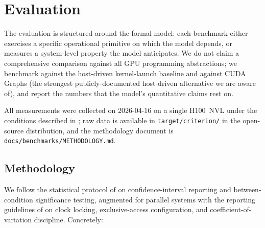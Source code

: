 \section{Evaluation}
\label{sec:evaluation}

The evaluation is structured around the formal model: each
benchmark either exercises a specific operational primitive on
which the model depends, or measures a system-level property the
model anticipates.  We do not claim a comprehensive comparison
against all GPU programming abstractions; we benchmark against the
host-driven kernel-launch baseline and against CUDA Graphs (the
strongest publicly-documented host-driven alternative we are aware
of), and report the numbers that the model's quantitative claims
rest on.

All measurements were collected on 2026-04-16 on a single H100~NVL
under the conditions described in
; raw data is available in
\texttt{target/criterion/} in the open-source distribution, and the
methodology document is \texttt{docs/benchmarks/METHODOLOGY.md}.

\subsection{Methodology}
\label{sec:eval:methodology}

We follow the statistical protocol of \citet{georges2007rigorous}
on confidence-interval reporting and between-condition significance
testing, augmented for parallel systems with the reporting
guidelines of \citet{hoefler2015scientific} on clock locking,
exclusive-access configuration, and coefficient-of-variation
discipline.  Concretely:

